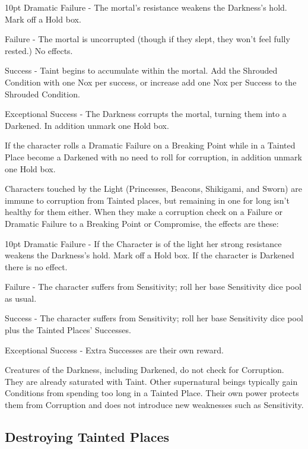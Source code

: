 \begin{myindentpar}{10pt}
    Dramatic Failure - The mortal's resistance weakens the Darkness's hold. Mark off a Hold box.
    
    Failure - The mortal is uncorrupted (though if they slept, they won't feel fully rested.) No effects.
    
    Success - Taint begins to accumulate within the mortal. Add the Shrouded Condition with one Nox per success, or increase add one Nox per Success to the Shrouded Condition.
    
    Exceptional Success - The Darkness corrupts the mortal, turning them into a Darkened. In addition unmark one Hold box.\end{myindentpar}
	
If the character rolls a Dramatic Failure on a Breaking Point while in a Tainted Place become a Darkened with no need to roll for corruption, in addition unmark one Hold box.

Characters touched by the Light (Princesses, Beacons, Shikigami, and Sworn) are immune to corruption from Tainted places, but remaining in one for long isn't healthy for them either. When they make a corruption check on a Failure or Dramatic Failure to a Breaking Point or Compromise, the effects are these:

\begin{myindentpar}{10pt}
    Dramatic Failure - If the Character is of the light her strong resistance weakens the Darkness's hold. Mark off a Hold box. If the character is Darkened there is no effect. 
    
    Failure - The character suffers from Sensitivity; roll her base Sensitivity dice pool as usual.
    
    Success - The character suffers from Sensitivity; roll her base Sensitivity dice pool plus the Tainted Places' Successes.
    
    Exceptional Success - Extra Successes are their own reward.\end{myindentpar}

Creatures of the Darkness, including Darkened, do not check for Corruption. They are already saturated with Taint. Other supernatural beings typically gain Conditions from spending too long in a Tainted Place. Their own power protects them from Corruption and does not introduce new weaknesses such as Sensitivity.

\subsection*{Destroying Tainted Places}

